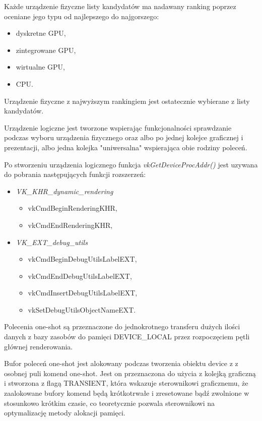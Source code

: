 Każde urządzenie fizyczne listy kandydatów ma nadawany ranking poprzez oceniane jego typu od najlepszego do najgorszego:
\begin{itemize}
	\item dyskretne GPU,
	\item zintegrowane GPU,
	\item wirtualne GPU,
	\item CPU.
\end{itemize}
Urządzenie fizyczne z najwyższym rankingiem jest ostatecznie wybierane z listy kandydatów.

Urządzenie logiczne jest tworzone wspierając funkcjonalności sprawdzanie podczas wyboru urządzenia fizycznego oraz albo po jednej kolejce graficznej i prezentacji, albo jedna kolejka "uniwersalna" wspierająca obie rodziny poleceń.

Po stworzeniu urządzenia logicznego funkcja \textit{vkGetDeviceProcAddr()} jest uzywana do pobrania następujących funkcji rozszerzeń:
\begin{itemize}
	\item \textit{VK\_KHR\_dynamic\_rendering}
	\begin{itemize}
		\item vkCmdBeginRenderingKHR,
		\item vkCmdEndRenderingKHR,
	\end{itemize}
	\item \textit{VK\_EXT\_debug\_utils}
	\begin{itemize}
		\item vkCmdBeginDebugUtilsLabelEXT,
		\item vkCmdEndDebugUtilsLabelEXT,
		\item vkCmdInsertDebugUtilsLabelEXT,
		\item vkSetDebugUtilsObjectNameEXT.
	\end{itemize} 
\end{itemize}

Polecenia one-shot są przeznaczone do jednokrotnego transferu dużych ilości danych z bazy zasobów do pamięci DEVICE\_LOCAL przez rozpoczęciem pętli głównej renderowania.


Bufor poleceń one-shot jest alokowany podczas tworzenia obiektu device z z osobnej puli komend one-shot. Jest on przeznaczona do użycia z kolejką graficzną i stworzona z flagą TRANSIENT, która wskazuje sterownikowi graficznemu, że zaalokowane bufory komend będą krótkotrwałe i zresetowane bądź zwolnione w stosunkowo krótkim czasie, co teoretycznie pozwala sterownikowi na optymalizację metody alokacji pamięci.

